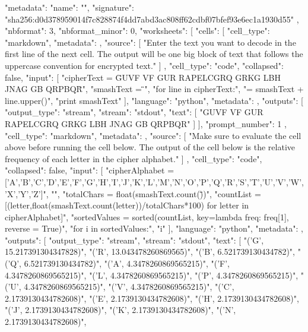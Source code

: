 \documentclass[handout]{ximera}
\begin{document}
\begin{python}
{
 "metadata": {
  "name": "",
  "signature": "sha256:d0d378959014f7c828874f4dd7abd3ac808ff62cdbf07bfef93e6ec1a1930d55"
 },
 "nbformat": 3,
 "nbformat_minor": 0,
 "worksheets": [
  {
   "cells": [
    {
     "cell_type": "markdown",
     "metadata": {},
     "source": [
      "Enter the text you want to decode in the first line of the next cell.  The output will be one big block of text that follows the uppercase convention for encrypted text."
     ]
    },
    {
     "cell_type": "code",
     "collapsed": false,
     "input": [
      "cipherText = \"GUVF VF GUR RAPELCGRQ GRKG LBH JNAG GB QRPBQR\"\n",
      "smashText = \"\"\n",
      "for line in cipherText:\n",
      "\tsmashText = smashText + line.upper()\n",
      "print smashText"
     ],
     "language": "python",
     "metadata": {},
     "outputs": [
      {
       "output_type": "stream",
       "stream": "stdout",
       "text": [
        "GUVF VF GUR RAPELCGRQ GRKG LBH JNAG GB QRPBQR\n"
       ]
      }
     ],
     "prompt_number": 1
    },
    {
     "cell_type": "markdown",
     "metadata": {},
     "source": [
      "Make sure to evaluate the cell above before running the cell below.  The output of the cell below is the relative frequency of each letter in the cipher alphabet."
     ]
    },
    {
     "cell_type": "code",
     "collapsed": false,
     "input": [
      "cipherAlphabet = ['A','B','C','D','E','F','G','H','I','J','K','L','M','N','O','P','Q','R','S','T','U','V','W','X','Y','Z']\n",
      "\n",
      "totalChars = float(smashText.count(\"\"))\n",
      "countList = [(letter,float(smashText.count(letter))/totalChars*100) for letter in cipherAlphabet]\n",
      "sortedValues = sorted(countList, key=lambda freq: freq[1], reverse = True)\n",
      "for i in sortedValues:\n",
      "\tprint i"
     ],
     "language": "python",
     "metadata": {},
     "outputs": [
      {
       "output_type": "stream",
       "stream": "stdout",
       "text": [
        "('G', 15.217391304347828)\n",
        "('R', 13.043478260869565)\n",
        "('B', 6.521739130434782)\n",
        "('Q', 6.521739130434782)\n",
        "('A', 4.3478260869565215)\n",
        "('F', 4.3478260869565215)\n",
        "('L', 4.3478260869565215)\n",
        "('P', 4.3478260869565215)\n",
        "('U', 4.3478260869565215)\n",
        "('V', 4.3478260869565215)\n",
        "('C', 2.1739130434782608)\n",
        "('E', 2.1739130434782608)\n",
        "('H', 2.1739130434782608)\n",
        "('J', 2.1739130434782608)\n",
        "('K', 2.1739130434782608)\n",
        "('N', 2.1739130434782608)\n",
}}}}
\end{python}
\end{document}
